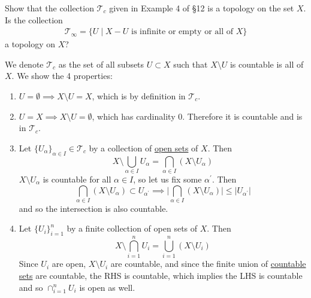  \begin{exercise}[Munkres 13.3]
    Show that the collection $\mathcal{T}_c$ given in Example 4 of \S12 is a topology on the set $X$. Is the collection
    \begin{align*}
      \mathcal{T}_\infty = \{U \mid X - U \text{ is infinite or empty or all of } X\}
    \end{align*}
    a topology on $X$?
  \end{exercise}
  \begin{solution}[Munkres 13.3]
    We denote $\mathcal{T}_c$ as the set of all subsets $U \subset X$ such that $X \setminus U$ is countable is all of $X$. We show the 4 properties: 
    \begin{enumerate}
      \item $U = \emptyset \implies X \setminus U = X$, which is by definition in $\mathcal{T}_c$. 
      \item $U = X \implies X \setminus U = \emptyset$, which has cardinality $0$. Therefore it is countable and is in $\mathcal{T}_c$. 

      \item Let $\{U_\alpha\}_{\alpha \in I} \in \mathcal{T}_c$ by a collection of \hyperref[def:open-set]{open sets} of $X$. Then 
      \begin{equation}
        X \setminus \bigcup_{\alpha \in I} U_{\alpha} = \bigcap_{\alpha \in I} (X \setminus U_\alpha)
      \end{equation}
      $X \setminus U_\alpha$ is countable for all $\alpha \in I$, so let us fix some $\alpha^\prime$. Then 
      \begin{equation}
        \bigcap_{\alpha \in I} (X \setminus U_\alpha) \subset U_{\alpha^\prime} \implies \bigg| \bigcap_{\alpha \in I} (X \setminus U_\alpha) \bigg| \leq \big| U_{\alpha^\prime} \big| 
      \end{equation}
      and so the intersection is also countable. 
      \item Let $\{U_i\}_{i=1}^n$ by a finite collection of open sets of $X$. Then 
      \begin{equation}
        X \setminus \bigcap_{i=1}^n U_i = \bigcup_{i=1}^n (X \setminus U_i)
      \end{equation}
      Since $U_i$ are open, $X \setminus U_i$ are countable, and since the finite union of \hyperref[st-def:countable]{countable sets} are countable, the RHS is countable, which implies the LHS is countable and so $\cap_{i=1}^n U_i$ is open as well. 
    \end{enumerate}


\end{solution}
